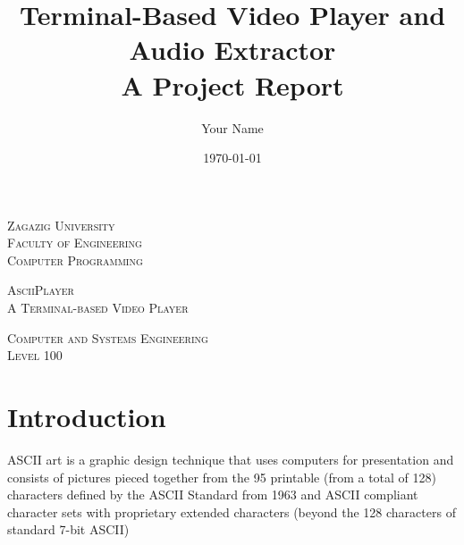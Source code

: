 \documentclass[a4paper,12pt]{article}
\title{Terminal-Based Video Player and Audio Extractor\\
       \large A Project Report}
\author{Your Name}
\date{\today}
\begin{document}
\begin{titlepage}

\begin{center}
    \textsc{Zagazig University \\}
	\textsc{Faculty of Engineering \\}
	\fontsize{5mm}{10mm}\selectfont 
  \textsc{Computer Programming  \\}
	\vspace{40mm}
 
  

	\fontsize{15mm}{10mm} 
	\textsc{AsciiPlayer\\}
	\fontsize{5mm}{10mm} 
	\textsc{A Terminal-based Video Player \\}
        \vspace{20mm}



\end{center}

\vspace{80mm}


\begin{center}
    
 
    \fontsize{5mm}{7mm}\selectfont 
    \textsc{{Computer and Systems Engineering } \\}
 	\vspace{1mm}
        \textsc{Level 100}
        \vspace{10mm}



\end{center}


\end{titlepage}

\tableofcontents
\newpage

\section{Introduction}
ASCII art is a graphic design technique that uses computers for presentation and consists of pictures pieced together from the 95 printable (from a total of 128) characters defined by the ASCII Standard from 1963 and ASCII compliant character sets with proprietary extended characters (beyond the 128 characters of standard 7-bit ASCII)
\end{document}
